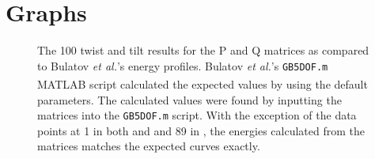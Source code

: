\documentclass[12pt]{report}
\begin{document}
\chapter{Graphs\label{app:graphs}}
\begin{figure}[ht!]
 \centering
 
 \quad
 \caption[A comparison of the \textlangle{}100\textrangle{} copper curves with the calculated results.]{\label{appfig:compare100} The \textlangle{}100\textrangle{} twist \protect{} and tilt \protect{} results for the P and Q matrices as compared to Bulatov \emph{et al.}'s energy profiles. Bulatov \emph{et al.}'s \lstinline!GB5DOF.m! MATLAB\textsuperscript{\textregistered} script calculated the expected values by using the default parameters.  The calculated values were found by inputting the matrices into the \lstinline!GB5DOF.m! script. With the exception of the data points at 1\textdegree{} in both \protect{} and \protect{} and 89\textdegree{} in \protect{}, the energies calculated from the matrices matches the expected curves exactly.}
\end{figure}
\end{document}
